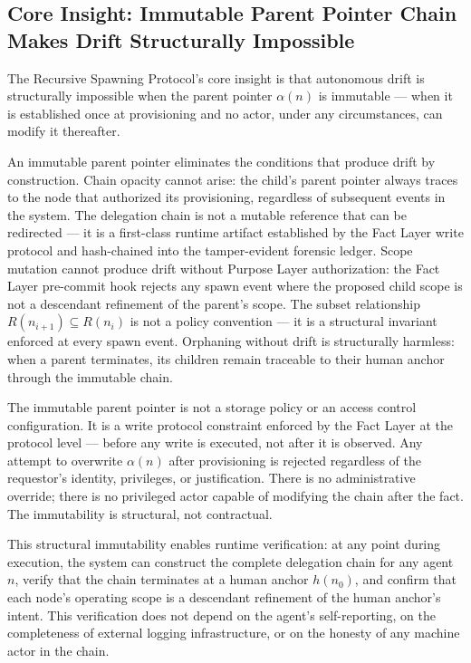 \subsection{Core Insight: Immutable Parent Pointer Chain Makes Drift Structurally Impossible}

The Recursive Spawning Protocol's core insight is that autonomous drift is structurally impossible when the parent pointer $\alpha(n)$ is immutable --- when it is established once at provisioning and no actor, under any circumstances, can modify it thereafter.

An immutable parent pointer eliminates the conditions that produce drift by construction. Chain opacity cannot arise: the child's parent pointer always traces to the node that authorized its provisioning, regardless of subsequent events in the system. The delegation chain is not a mutable reference that can be redirected --- it is a first-class runtime artifact established by the Fact Layer write protocol and hash-chained into the tamper-evident forensic ledger. Scope mutation cannot produce drift without Purpose Layer authorization: the Fact Layer pre-commit hook rejects any spawn event where the proposed child scope is not a descendant refinement of the parent's scope. The subset relationship $R(n_{i+1}) \subseteq R(n_i)$ is not a policy convention --- it is a structural invariant enforced at every spawn event. Orphaning without drift is structurally harmless: when a parent terminates, its children remain traceable to their human anchor through the immutable chain.

The immutable parent pointer is not a storage policy or an access control configuration. It is a write protocol constraint enforced by the Fact Layer at the protocol level --- before any write is executed, not after it is observed. Any attempt to overwrite $\alpha(n)$ after provisioning is rejected regardless of the requestor's identity, privileges, or justification. There is no administrative override; there is no privileged actor capable of modifying the chain after the fact. The immutability is structural, not contractual.

This structural immutability enables runtime verification: at any point during execution, the system can construct the complete delegation chain for any agent $n$, verify that the chain terminates at a human anchor $h(n_0)$, and confirm that each node's operating scope is a descendant refinement of the human anchor's intent. This verification does not depend on the agent's self-reporting, on the completeness of external logging infrastructure, or on the honesty of any machine actor in the chain.

